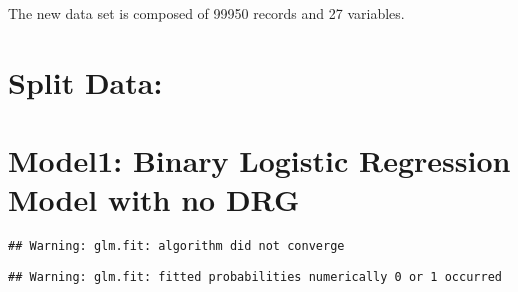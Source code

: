 \documentclass[11pt,]{article}
\begin{document}
The new data set is composed of 99950 records and 27 variables.

\section{Split Data:}\label{split-data}

\section{Model1: Binary Logistic Regression Model with no
DRG}\label{model1-binary-logistic-regression-model-with-no-drg}

\begin{verbatim}
## Warning: glm.fit: algorithm did not converge
\end{verbatim}

\begin{verbatim}
## Warning: glm.fit: fitted probabilities numerically 0 or 1 occurred
\end{verbatim}
\end{document}

